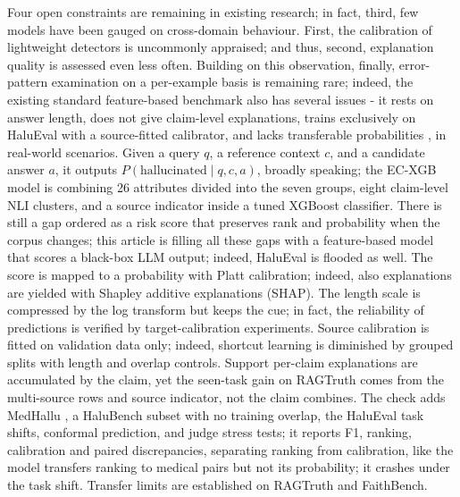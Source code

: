 \documentclass[a4paper,fleqn]{cas-sc}
\begin{document}
Four open constraints are remaining in existing research; in fact, third, few models have been gauged on cross-domain behaviour. First, the calibration of lightweight detectors is uncommonly appraised; and thus, second, explanation quality is assessed even less often. Building on this observation, finally, error-pattern examination on a per-example basis is remaining rare; indeed, the existing standard feature-based benchmark also has several issues - it rests on answer length, does not give claim-level explanations, trains exclusively on HaluEval with a source-fitted calibrator, and lacks transferable probabilities \cite{ovadia2019}, in real-world scenarios. Given a query $q$, a reference context $c$, and a candidate answer $a$, it outputs $P(\text{hallucinated}\mid q,c,a)$, broadly speaking; the EC-XGB model is combining 26 attributes divided into the seven groups, eight claim-level NLI clusters, and a source indicator inside a tuned XGBoost classifier. There is still a gap ordered as a risk score that preserves rank and probability when the corpus changes; this article is filling all these gaps with a feature-based model that scores a black-box LLM output; indeed, HaluEval is flooded as well. The score is mapped to a probability with Platt calibration; indeed, also explanations are yielded with Shapley additive explanations (SHAP). The length scale is compressed by the log transform but keeps the cue; in fact, the reliability of predictions is verified by target-calibration experiments. Source calibration is fitted on validation data only; indeed, shortcut learning is diminished by grouped splits with length and overlap controls. Support per-claim explanations are accumulated by the claim, yet the seen-task gain on RAGTruth comes from the multi-source rows and source indicator, not the claim combines. The check adds MedHallu \cite{pandit2025medhallu}, a HaluBench subset \cite{ravi2024lynx} with no training overlap, the HaluEval task shifts, conformal prediction, and judge stress tests; it reports F1, ranking, calibration and paired discrepancies, separating ranking from calibration, like the model transfers ranking to medical pairs but not its probability; it crashes under the task shift. Transfer limits are established on RAGTruth and FaithBench.
\end{document}
